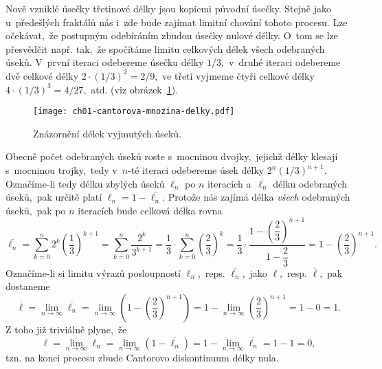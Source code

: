 Nově vzniklé úsečky třetinové délky jsou kopiemi původní úsečky. Stejně jako u~předešlých fraktálů nás i~zde bude zajímat limitní chování tohoto procesu. Lze očekávat,~že postupným odebíráním zbudou úsečky nulové délky. O~tom se lze přesvědčit např. tak,~že spočítáme limitu celkových délek všech odebraných úseků. V~první iteraci odebereme úsečku délky $1/3$,~v~druhé iteraci odebereme dvě celkové délky $2\cdot(1/3)^2=2/9$,~ve třetí vyjmeme čtyři celkové délky $4\cdot(1/3)^3=4/27$,~atd. (viz obrázek~\ref{fig:cantorovo_diskontinuum_delky}).
\begin{figure}[h]
    \centering
    \texttt{[image: ch01-cantorova-mnozina-delky.pdf]}
    \caption{Znázornění délek vyjmutých úseků.}
    \label{fig:cantorovo_diskontinuum_delky}
\end{figure}
Obecně počet odebraných úseků roste s~mocninou dvojky,~jejichž délky klesají s~mocninou trojky,~tedy v~$n$-té iteraci odebereme úsek délky $2^n(1/3)^{n+1}$. Označíme-li tedy délku zbylých úseků $\ell_n$ po $n$ iteracích a~$\overline{\ell_n}$ délku odebraných úseků,~pak určitě platí $\ell_n=1-\overline{\ell_n}$. Protože nás zajímá délka \emph{všech} odebraných úseků,~pak po $n$ iteracích bude celková délka rovna
\begin{equation}
    \overline{\ell_n}=\sum_{k=0}^{n}2^k\left(\dfrac{1}{3}\right)^{k+1}=\sum_{k=0}^{n}\dfrac{2^k}{3^{k+1}}=\dfrac{1}{3}\cdot\sum_{k=0}^{n}\left(\dfrac{2}{3}\right)^k=\dfrac{1}{3}\cdot\dfrac{1-\left(\dfrac{2}{3}\right)^{n+1}}{1-\dfrac{2}{3}}=1-\left(\dfrac{2}{3}\right)^{n+1}.
\end{equation}
Označíme-li si limitu výrazů posloupností $\ell_n$,~reps. $\overline{\ell_n}$,~jako $\ell$,~resp. $\overline{\ell}$,~pak dostaneme
\begin{equation*}
    \overline{\ell}=\lim_{n\to\infty}\overline{\ell_n}=\lim_{n\to\infty}\left(1-\left(\dfrac{2}{3}\right)^{n+1}\right)=1-\lim_{n\to\infty}\left(\dfrac{2}{3}\right)^{n+1}=1-0=1.
\end{equation*}
Z toho již triviálně plyne,~že
\begin{equation}
    \ell=\lim_{n\to\infty}\ell_n=\lim_{n\to\infty}(1-\overline{\ell_n})=1-\lim_{n\to\infty}\overline{\ell_n}=1-1=0,
\end{equation}
tzn. na konci procesu zbude Cantorovo diskontinuum délky nula.